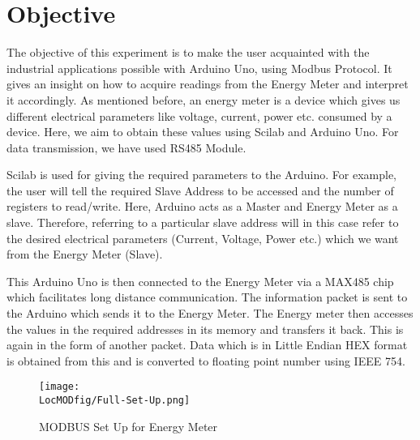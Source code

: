 \section{Objective}
The objective of this experiment is to make the user acquainted with the industrial applications possible with Arduino Uno, using Modbus  Protocol. It gives an insight on how to acquire readings from the Energy Meter and interpret it accordingly. As mentioned before, an energy meter is a device which gives us different electrical parameters like voltage, current, power etc. consumed by a device. Here, we aim to obtain these values using Scilab and Arduino Uno. For data transmission, we have used RS485 Module.

Scilab is used for giving the required parameters to the Arduino. For example, the user will tell the required Slave Address to be accessed and the number of registers to read/write. Here, Arduino acts as a Master and Energy Meter as a slave. Therefore, referring to a particular slave address will in this case refer to the desired electrical parameters (Current, Voltage, Power etc.)  which we want from the Energy Meter (Slave).

This Arduino Uno is then connected to the Energy Meter via a MAX485 chip which facilitates long distance communication. The information packet is sent to the Arduino which sends it to the Energy Meter. The Energy meter then accesses the values in the required addresses in its memory and transfers it back. This is again in the form of another packet. Data which is in Little Endian HEX format is obtained from this and is converted to floating point number using IEEE 754.

\begin{figure}
\centering
\texttt{[image: \\LocMODfig/Full-Set-Up.png]}
\caption{MODBUS Set Up for Energy Meter}
\label{fig:full-set-up}
\end{figure}

